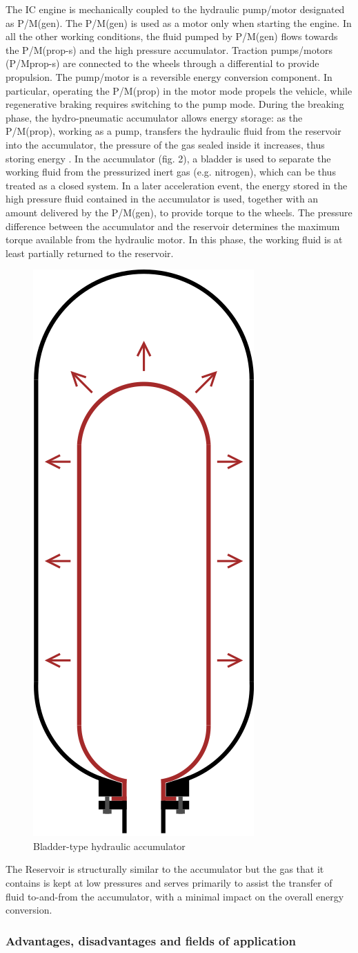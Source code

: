 \documentclass[11pt]{article}
\begin{document}
The IC engine is mechanically coupled to the hydraulic pump/motor designated as P/M(gen). The P/M(gen) is used as a motor only when starting the engine. In all the other working conditions, the fluid pumped by P/M(gen) flows towards the P/M(prop-s) and the high pressure accumulator. Traction pumps/motors (P/Mprop-s) are connected to the wheels through a differential to provide propulsion. The pump/motor is a reversible energy conversion component. In particular, operating the P/M(prop) in the motor mode propels the vehicle, while regenerative braking requires switching to the pump mode. During the breaking phase, the hydro-pneumatic accumulator allows energy storage: as the P/M(prop), working as a pump, transfers the hydraulic fluid from the reservoir into the accumulator, the pressure of the gas sealed inside it increases, thus storing energy \cite{e}. In the accumulator (fig. 2), a bladder is used to separate the working fluid from the pressurized inert gas (e.g. nitrogen), which can be thus treated as a closed system. In a later acceleration event, the energy stored in the high pressure fluid contained in the accumulator is used, together with an amount delivered by the P/M(gen), to provide torque to the wheels. The pressure difference between the accumulator and the reservoir determines the maximum torque available from the hydraulic motor. In this phase, the working fluid is at least partially returned to the reservoir. 

\begin{figure}[H]
\centering
\includegraphics[width=.1\textwidth]{Images/Hydraulic Accumulator.png}
\caption{Bladder-type hydraulic accumulator}
\label{StepF1}
\end{figure}

The Reservoir is structurally similar to the accumulator but the gas that it contains is kept at low pressures and serves primarily to assist the transfer of fluid to-and-from the accumulator, with a minimal impact on the overall energy conversion. 

\subsubsection{Advantages, disadvantages and fields of application}
\end{document}
